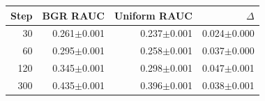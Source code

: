 \begin{tabular}{rrrr}
\hline
Step & BGR RAUC & Uniform RAUC & $\Delta$ \\
\hline
30 & 0.261$\pm$0.001 & 0.237$\pm$0.001 & 0.024$\pm$0.000 \\
60 & 0.295$\pm$0.001 & 0.258$\pm$0.001 & 0.037$\pm$0.000 \\
120 & 0.345$\pm$0.001 & 0.298$\pm$0.001 & 0.047$\pm$0.001 \\
300 & 0.435$\pm$0.001 & 0.396$\pm$0.001 & 0.038$\pm$0.001 \\
\hline
\end{tabular}

